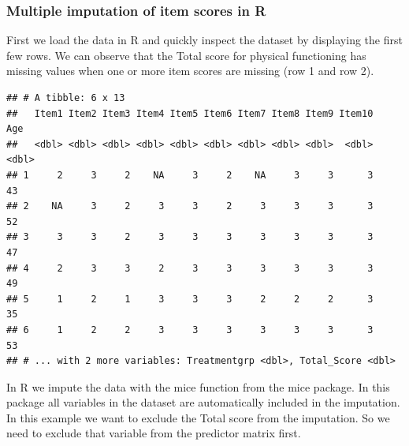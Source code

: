\documentclass[]{book}
\newenvironment{Shaded}{\begin{snugshade}}{\end{snugshade}}
\newcommand{\KeywordTok}[1]{\textcolor[rgb]{0.13,0.29,0.53}{\textbf{#1}}}
\newcommand{\DataTypeTok}[1]{\textcolor[rgb]{0.13,0.29,0.53}{#1}}
\newcommand{\DecValTok}[1]{\textcolor[rgb]{0.00,0.00,0.81}{#1}}
\newcommand{\StringTok}[1]{\textcolor[rgb]{0.31,0.60,0.02}{#1}}
\newcommand{\CommentTok}[1]{\textcolor[rgb]{0.56,0.35,0.01}{\textit{#1}}}
\newcommand{\OtherTok}[1]{\textcolor[rgb]{0.56,0.35,0.01}{#1}}
\newcommand{\OperatorTok}[1]{\textcolor[rgb]{0.81,0.36,0.00}{\textbf{#1}}}
\newcommand{\NormalTok}[1]{#1}
\begin{document}
\subsubsection{Multiple imputation of item scores in
R}\label{multiple-imputation-of-item-scores-in-r}

First we load the data in R and quickly inspect the dataset by
displaying the first few rows. We can observe that the Total score for
physical functioning has missing values when one or more item scores are
missing (row 1 and row 2).

\begin{Shaded}
\end{Shaded}

\begin{verbatim}
## # A tibble: 6 x 13
##   Item1 Item2 Item3 Item4 Item5 Item6 Item7 Item8 Item9 Item10   Age
##   <dbl> <dbl> <dbl> <dbl> <dbl> <dbl> <dbl> <dbl> <dbl>  <dbl> <dbl>
## 1     2     3     2    NA     3     2    NA     3     3      3    43
## 2    NA     3     2     3     3     2     3     3     3      3    52
## 3     3     3     2     3     3     3     3     3     3      3    47
## 4     2     3     3     2     3     3     3     3     3      3    49
## 5     1     2     1     3     3     3     2     2     2      3    35
## 6     1     2     2     3     3     3     3     3     3      3    53
## # ... with 2 more variables: Treatmentgrp <dbl>, Total_Score <dbl>
\end{verbatim}

In R we impute the data with the mice function from the mice package. In
this package all variables in the dataset are automatically included in
the imputation. In this example we want to exclude the Total score from
the imputation. So we need to exclude that variable from the predictor
matrix first.

\begin{Shaded}
\end{Shaded}
\end{document}
